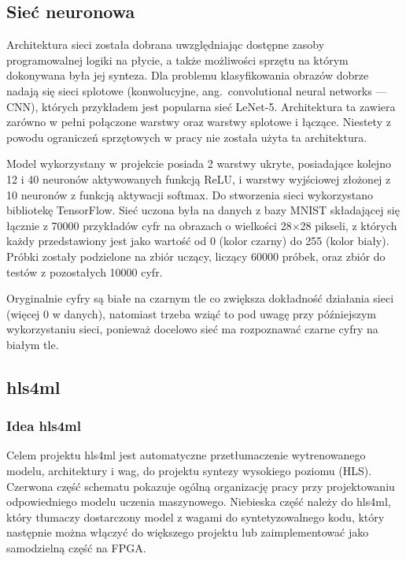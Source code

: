 \documentclass[12pt, oneside]{article}
\begin{document}
\subsection{Sieć neuronowa}
Architektura sieci została dobrana uwzględniając dostępne zasoby programowalnej
logiki na płycie, a także możliwości sprzętu na którym dokonywana była jej
synteza. Dla problemu klasyfikowania obrazów dobrze nadają się sieci
splotowe (konwolucyjne, ang.\ convolutional neural networks --- CNN), 
 których przykładem jest popularna sieć \mbox{LeNet-5}.
Architektura ta zawiera zarówno w pełni połączone warstwy
oraz warstwy splotowe i łączące.
Niestety z powodu ograniczeń sprzętowych w pracy nie została użyta ta
architektura.

Model wykorzystany w projekcie posiada 2 warstwy ukryte, posiadające kolejno
12 i 40 neuronów aktywowanych funkcją ReLU, i warstwy wyjściowej złożonej
z 10 neuronów z funkcją aktywacji softmax. Do stworzenia sieci wykorzystano
bibliotekę TensorFlow. Sieć uczona była na danych
z bazy MNIST składającej się łącznie z 70000 przykładów
cyfr na obrazach o wielkości 28\(\times \)28 pikseli, z których każdy
przedstawiony jest jako wartość od 0 (kolor czarny) do 255 (kolor biały).
Próbki zostały
podzielone na zbiór uczący, liczący 60000 próbek, oraz zbiór do testów
z pozostałych 10000 cyfr.

Oryginalnie cyfry są białe na czarnym tle co zwiększa
 dokładność działania sieci (więcej 0 w danych),
natomiast trzeba wziąć to pod uwagę przy późniejszym wykorzystaniu sieci,
ponieważ docelowo sieć ma rozpoznawać czarne cyfry na białym tle.

\subsection{hls4ml}
\subsubsection{Idea hls4ml}
Celem projektu hls4ml jest automatyczne przetłumaczenie wytrenowanego modelu,
architektury i wag, do projektu syntezy wysokiego poziomu (HLS).
Czerwona część schematu pokazuje ogólną organizację pracy przy projektowaniu 
odpowiedniego modelu uczenia maszynowego. Niebieska część należy do hls4ml,
który tłumaczy dostarczony model z wagami do syntetyzowalnego kodu, który
następnie można włączyć do większego projektu lub zaimplementować jako
samodzielną część na FPGA.
\end{document}
